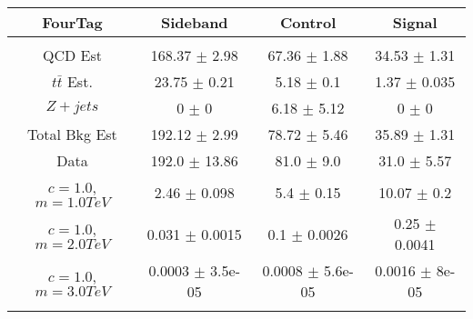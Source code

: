 \begin{footnotesize} 
\begin{tabular}{c|c|c|c} 
FourTag & Sideband & Control & Signal \\ 
\hline\hline 
& & & \\ 
QCD Est & 168.37 $\pm$ 2.98 & 67.36 $\pm$ 1.88 & 34.53 $\pm$ 1.31\\ 
$t\bar{t}$ Est.  & 23.75 $\pm$ 0.21 & 5.18 $\pm$ 0.1 & 1.37 $\pm$ 0.035\\ 
$Z+jets$ & 0 $\pm$ 0 & 6.18 $\pm$ 5.12 & 0 $\pm$ 0\\ 
Total Bkg Est & 192.12 $\pm$ 2.99 & 78.72 $\pm$ 5.46 & 35.89 $\pm$ 1.31\\ 
Data & 192.0 $\pm$ 13.86 & 81.0 $\pm$ 9.0 & 31.0 $\pm$ 5.57\\ 
$c=1.0$,$m=1.0TeV$ & 2.46 $\pm$ 0.098 & 5.4 $\pm$ 0.15 & 10.07 $\pm$ 0.2\\ 
$c=1.0$,$m=2.0TeV$ & 0.031 $\pm$ 0.0015 & 0.1 $\pm$ 0.0026 & 0.25 $\pm$ 0.0041\\ 
$c=1.0$,$m=3.0TeV$ & 0.0003 $\pm$ 3.5e-05 & 0.0008 $\pm$ 5.6e-05 & 0.0016 $\pm$ 8e-05\\ 
& & & \\ 
\hline\hline 
\end{tabular} 
\end{footnotesize} 
\newline 
